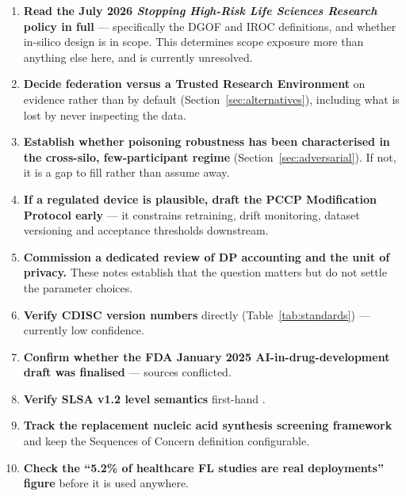 \documentclass[11pt,a4paper]{article}
\newcommand{\flag}[1]{\textcolor{flagcolor}{\textbf{#1}}}
\begin{document}
\begin{enumerate}
  \item \flag{Read the July 2026 \emph{Stopping High-Risk Life Sciences
  Research} policy in full} \citep{usgstopping2026} --- specifically the
  DGOF and IROC definitions, and whether in-silico design is in scope. This
  determines scope exposure more than anything else here, and is currently
  unresolved.

  \item \textbf{Decide federation versus a Trusted Research Environment}
  on evidence rather than by default (Section~\ref{sec:alternatives}),
  including what is lost by never inspecting the data.

  \item \textbf{Establish whether poisoning robustness has been
  characterised in the cross-silo, few-participant regime}
  (Section~\ref{sec:adversarial}). If not, it is a gap to fill rather than
  assume away.

  \item \textbf{If a regulated device is plausible, draft the PCCP
  Modification Protocol early} \citep{fdapccp2024} --- it constrains
  retraining, drift monitoring, dataset versioning and acceptance
  thresholds downstream.

  \item \textbf{Commission a dedicated review of DP accounting and the unit
  of privacy.} These notes establish that the question matters but do not
  settle the parameter choices.

  \item \textbf{Verify CDISC version numbers} directly
  (Table~\ref{tab:standards}) --- currently low confidence.

  \item \textbf{Confirm whether the FDA January 2025 AI-in-drug-development
  draft was finalised} \citep{fdaaidrug2025} --- sources conflicted.

  \item \textbf{Verify SLSA v1.2 level semantics} first-hand
  \citep{slsa}.

  \item \textbf{Track the replacement nucleic acid synthesis screening
  framework} \citep{nucleicacid2024} and keep the Sequences of Concern
  definition configurable.

  \item \textbf{Check the ``5.2\% of healthcare FL studies are real
  deployments'' figure} before it is used anywhere.
\end{enumerate}
\end{document}
